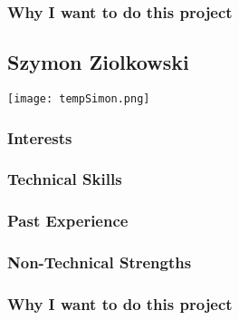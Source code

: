 \subsubsection{Why I want to do this project}

\subsection{Szymon Ziolkowski}
\texttt{[image: tempSimon.png]}

\subsubsection{Interests}
\subsubsection{Technical Skills}
\subsubsection{Past Experience}
\subsubsection{Non-Technical Strengths}
\subsubsection{Why I want to do this project}
